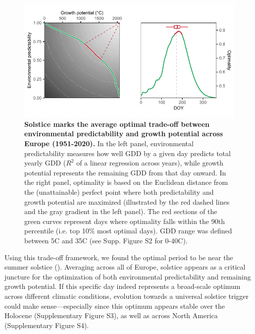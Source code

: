 \documentclass[11pt,letter]{article}
\begin{document}
\begin{figure}[h]
\vspace*{-0.3cm}
\centering
\includegraphics{global_optimality.pdf}
\vspace*{-0.6cm}
\caption{\textbf{Solstice marks the average optimal trade-off between environmental predictability and growth potential across Europe (1951-2020).} In the left panel, environmental predictability measures how well GDD by a given day predicts total yearly GDD ($R^2$ of a linear regression across years), while growth potential represents the remaining GDD from that day onward. In the right panel, optimality is based on the Euclidean distance from the (unattainable) perfect point where both predictability and growth potential are maximized (illustrated by the red dashed lines and the gray gradient in the left panel). The red sections of the green curves represent days where optimality falls within the 90th percentile (i.e. top 10\% most optimal days). GDD range was defined between 5\degree C and 35\degree C (see Supp. Figure S2 for 0-40\degree C).} 
\vspace*{-0.5cm}
\label{fig:globaloptimality}
\end{figure}

\clearpage

Using this trade-off framework, we found the optimal period to be near the summer solstice (). Averaging across all of Europe, solstice appears as a critical juncture for the optimization of both environmental predictability and remaining growth potential.
If this specific day indeed represents a broad-scale optimum across different climatic conditions, evolution towards a universal solstice trigger could make sense---especially since this optimum appears stable over the Holocene (Supplementary Figure S3), as well as across North America (Supplementary Figure S4).
\end{document}
